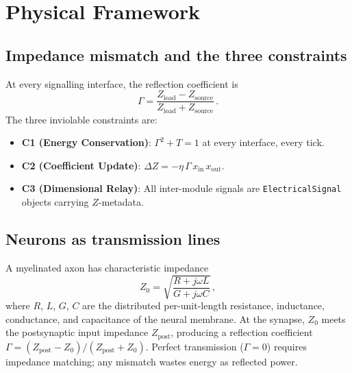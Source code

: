 \documentclass[aps,pre,twocolumn,superscriptaddress,floatfix]{revtex4-2}
\begin{document}
\section{Physical Framework}
\label{sec:framework}

\subsection{Impedance mismatch and the three constraints}

At every signalling interface, the reflection coefficient is
\begin{equation}
  \Gamma = \frac{Z_{\mathrm{load}} - Z_{\mathrm{source}}}
               {Z_{\mathrm{load}} + Z_{\mathrm{source}}}\,.
  \label{eq:gamma}
\end{equation}
The three inviolable constraints are:
\begin{itemize}
  \item \textbf{C1 (Energy Conservation)}:
    $\Gamma^2 + T = 1$ at every interface, every tick.
  \item \textbf{C2 (Coefficient Update)}:
    $\Delta Z = -\eta\,\Gamma\,x_{\mathrm{in}}\,x_{\mathrm{out}}$.
  \item \textbf{C3 (Dimensional Relay)}:
    All inter-module signals are \texttt{ElectricalSignal}
    objects carrying $Z$-metadata.
\end{itemize}


\subsection{Neurons as transmission lines}
\label{sec:neuron-TL}

A myelinated axon has characteristic impedance
\begin{equation}
  Z_0 = \sqrt{\frac{R + j\omega L}{G + j\omega C}}\,,
  \label{eq:Z0}
\end{equation}
where $R$, $L$, $G$, $C$ are the distributed per-unit-length
resistance, inductance, conductance, and capacitance
of the neural membrane.
At the synapse, $Z_0$ meets the postsynaptic input impedance
$Z_{\mathrm{post}}$, producing a reflection coefficient
$\Gamma = (Z_{\mathrm{post}} - Z_0)/(Z_{\mathrm{post}} + Z_0)$.
Perfect transmission ($\Gamma = 0$) requires impedance matching;
any mismatch wastes energy as reflected power.
\end{document}
